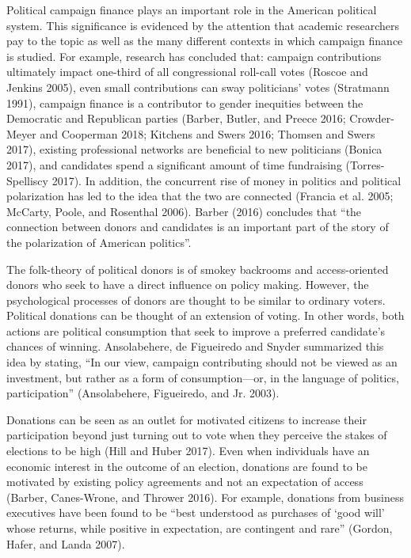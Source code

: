 \documentclass[12pt,]{article}
\begin{document}
\vskip -8.5pt



\noindent \doublespacing 

Political campaign finance plays an important role in the American
political system. This significance is evidenced by the attention that
academic researchers pay to the topic as well as the many different
contexts in which campaign finance is studied. For example, research has
concluded that: campaign contributions ultimately impact one-third of
all congressional roll-call votes (Roscoe and Jenkins 2005), even small
contributions can sway politicians' votes (Stratmann 1991), campaign
finance is a contributor to gender inequities between the Democratic and
Republican parties (Barber, Butler, and Preece 2016; Crowder-Meyer and
Cooperman 2018; Kitchens and Swers 2016; Thomsen and Swers 2017),
existing professional networks are beneficial to new politicians (Bonica
2017), and candidates spend a significant amount of time fundraising
(Torres-Spelliscy 2017). In addition, the concurrent rise of money in
politics and political polarization has led to the idea that the two are
connected (Francia et al. 2005; McCarty, Poole, and Rosenthal 2006).
Barber (2016) concludes that ``the connection between donors and
candidates is an important part of the story of the polarization of
American politics''.

The folk-theory of political donors is of smokey backrooms and
access-oriented donors who seek to have a direct influence on policy
making. However, the psychological processes of donors are thought to be
similar to ordinary voters. Political donations can be thought of an
extension of voting. In other words, both actions are political
consumption that seek to improve a preferred candidate's chances of
winning. Ansolabehere, de Figueiredo and Snyder summarized this idea by
stating, ``In our view, campaign contributing should not be viewed as an
investment, but rather as a form of consumption---or, in the language of
politics, participation'' (Ansolabehere, Figueiredo, and Jr. 2003).

Donations can be seen as an outlet for motivated citizens to increase
their participation beyond just turning out to vote when they perceive
the stakes of elections to be high (Hill and Huber 2017). Even when
individuals have an economic interest in the outcome of an election,
donations are found to be motivated by existing policy agreements and
not an expectation of access (Barber, Canes-Wrone, and Thrower 2016).
For example, donations from business executives have been found to be
``best understood as purchases of `good will' whose returns, while
positive in expectation, are contingent and rare'' (Gordon, Hafer, and
Landa 2007).
\end{document}
